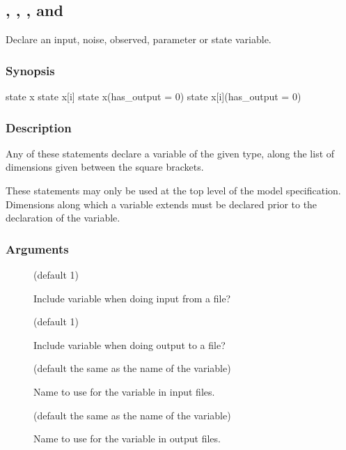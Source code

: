 \subsection{\label{input}, \label{noise}, \label{obs}, \label{param} and \label{state}}

Declare an input, noise, observed, parameter or state variable.

\subsubsection*{Synopsis\label{var_Synopsis}}

\begin{bicode}
    state x
    state x[i]
    state x(has_output = 0)
    state x[i](has_output = 0)
\end{bicode}

\subsubsection*{Description\label{var_Description}}

Any of these statements declare a variable of the given type, along the list
of dimensions given between the square brackets.

These statements may only be used at the top level of the model
specification. Dimensions along which a variable extends must be declared
prior to the declaration of the variable.

\subsubsection*{Arguments\label{var_Arguments}}

\begin{description}
\item[] (default 1)

Include variable when doing input from a file?

\item[] (default 1)

Include variable when doing output to a file?

\item[] (default the same as the name of the
  variable)

Name to use for the variable in input files.

\item[] (default the same as the name of the
  variable)

Name to use for the variable in output files.
\end{description}

